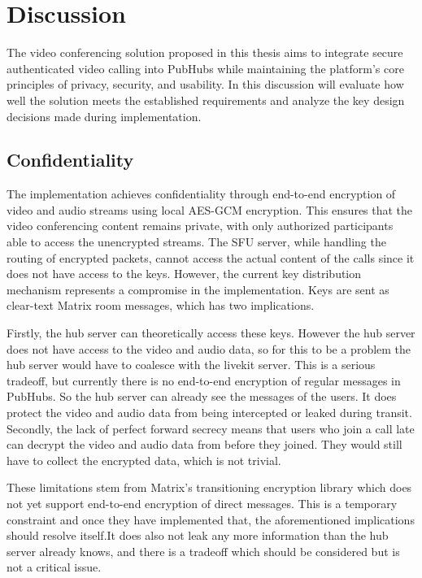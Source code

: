 \documentclass{report}
\begin{document}
\chapter{Discussion}
The video conferencing solution proposed in this thesis aims to integrate secure authenticated video calling into
PubHubs while maintaining the platform's core principles of privacy, security, and usability. In this discussion will
evaluate how well the solution meets the established requirements and analyze the key design decisions made during
implementation.

\section{Confidentiality}
The implementation achieves confidentiality through end-to-end encryption of video and audio streams using local
AES-GCM encryption. This ensures that the video conferencing content remains private, with only authorized
participants able to access the unencrypted streams. The SFU server, while handling the routing of encrypted
packets, cannot access the actual content of the calls since it does not have access to the keys. However, the current
key distribution mechanism represents a compromise in the implementation. Keys are sent as
clear-text Matrix room messages, which has two implications.

Firstly, the hub server can theoretically access these
keys. However the hub server does not have access to the video and audio data, so for this to be a problem the hub
server would have to coalesce with the livekit server. This is a serious tradeoff, but currently there is no end-to-end
encryption of regular messages in PubHubs. So the hub server can already see the messages of the users. It does protect
the video and audio data from being intercepted or leaked during transit. Secondly, the lack of perfect forward
secrecy means that users who join a call late can decrypt the video and audio data from before they joined. They would
still have to collect the encrypted data, which is not trivial.

These limitations stem from Matrix's transitioning encryption library which does not yet support end-to-end
encryption of direct messages. This is a temporary constraint and once they have implemented that, the
aforementioned implications should resolve itself.It does also not leak any more information than the hub server
already knows, and there is a tradeoff which should be considered but is not a critical issue.
\end{document}
